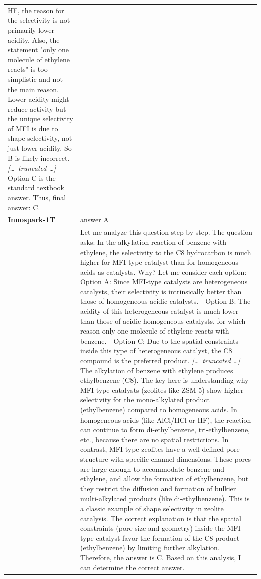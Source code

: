 \begin{longtable}{@{}l p{12.5cm}@{}}
HF, the reason for the selectivity is not primarily lower acidity. Also, the statement "only one molecule of ethylene reacts" is too simplistic and not the main reason. Lower acidity might reduce activity but the unique selectivity of MFI is due to shape selectivity, not just lower acidity. So B is likely incorrect. \newline \textit{[\ldots\ truncated \ldots]} \newline Option C is the standard textbook answer. \newline Thus, final answer: C. \\
  \textbf{Innospark-1T} & answer A \\
  & Let me analyze this question step by step. \newline The question asks: In the alkylation reaction of benzene with ethylene, the selectivity to the C8 hydrocarbon is much higher for MFI-type catalyst than for homogeneous acids as catalysts. Why? \newline Let me consider each option: \newline - Option A: Since MFI-type catalysts are heterogeneous catalysts, their selectivity is intrinsically better than those of homogeneous acidic catalysts. \newline - Option B: The acidity of this heterogeneous catalyst is much lower than those of acidic homogeneous catalysts, for which reason only one molecule of ethylene reacts with benzene. \newline - Option C: Due to the spatial constraints inside this type of heterogeneous catalyst, the C8 compound is the preferred product. \newline \textit{[\ldots\ truncated \ldots]} \newline The alkylation of benzene with ethylene produces ethylbenzene (C8). The key here is understanding why MFI-type catalysts (zeolites like ZSM-5) show higher selectivity for the mono-alkylated product (ethylbenzene) compared to homogeneous acids. In homogeneous acids (like AlCl/HCl or HF), the reaction can continue to form di-ethylbenzene, tri-ethylbenzene, etc., because there are no spatial restrictions. In contrast, MFI-type zeolites have a well-defined pore structure with specific channel dimensions. These pores are large enough to accommodate benzene and ethylene, and allow the formation of ethylbenzene, but they restrict the diffusion and formation of bulkier multi-alkylated products (like di-ethylbenzene). This is a classic example of shape selectivity in zeolite catalysis. The correct explanation is that the spatial constraints (pore size and geometry) inside the MFI-type catalyst favor the formation of the C8 product (ethylbenzene) by limiting further alkylation. Therefore, the answer is C. \newline Based on this analysis, I can determine the correct answer. \\

\end{longtable}
